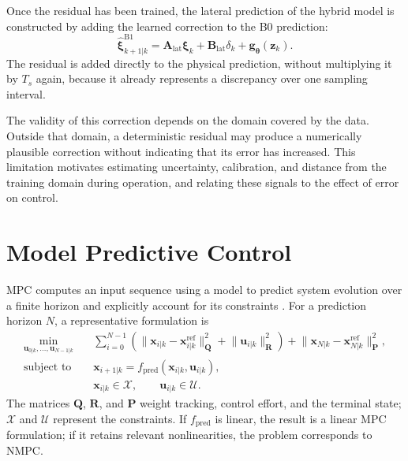 \documentclass[12pt,a4paper]{report}
\begin{document}
Once the residual has been trained, the lateral prediction of the hybrid model is constructed by adding the learned correction to the B0 prediction:
%
\begin{equation}
    \boxed{
    \hat{\boldsymbol{\xi}}^{\mathrm{B1}}_{k+1|k}
    =
    \mathbf{A}_{\mathrm{lat}}\boldsymbol{\xi}_k
    +
    \mathbf{B}_{\mathrm{lat}}\delta_k
    +
    \mathbf{g}_{\boldsymbol{\theta}}(\mathbf{z}_k).
    }
    \label{eq:b1_hybrid_prediction}
\end{equation}
%
The residual is added directly to the physical prediction, without multiplying it by $T_s$ again, because it already represents a discrepancy over one sampling interval.

The validity of this correction depends on the domain covered by the data. Outside that domain, a deterministic residual may produce a numerically plausible correction without indicating that its error has increased. This limitation motivates estimating uncertainty, calibration, and distance from the training domain during operation, and relating these signals to the effect of error on control.

\section{Model Predictive Control}

MPC computes an input sequence using a model to predict system evolution over a finite horizon and explicitly account for its constraints \cite{Su2026ReinforcementLearningBased}. For a prediction horizon $N$, a representative formulation is
\begin{align}
    \min_{\mathbf{u}_{0|k},\ldots,\mathbf{u}_{N-1|k}}\quad
    & \sum_{i=0}^{N-1}
      \left(
        \lVert \mathbf{x}_{i|k}-\mathbf{x}^{\mathrm{ref}}_{i|k}\rVert_{\mathbf{Q}}^2
        +
        \lVert \mathbf{u}_{i|k}\rVert_{\mathbf{R}}^2
      \right)
      +
      \lVert \mathbf{x}_{N|k}-\mathbf{x}^{\mathrm{ref}}_{N|k}\rVert_{\mathbf{P}}^2,
    \label{eq:mpc_cost}\\
    \text{subject to}\quad
    & \mathbf{x}_{i+1|k}
      =
      f_{\mathrm{pred}}(\mathbf{x}_{i|k},\mathbf{u}_{i|k}), \nonumber\\
    & \mathbf{x}_{i|k}\in\mathcal{X},\qquad
      \mathbf{u}_{i|k}\in\mathcal{U}. \nonumber
\end{align}
The matrices $\mathbf{Q}$, $\mathbf{R}$, and $\mathbf{P}$ weight tracking, control effort, and the terminal state; $\mathcal{X}$ and $\mathcal{U}$ represent the constraints. If $f_{\mathrm{pred}}$ is linear, the result is a linear MPC formulation; if it retains relevant nonlinearities, the problem corresponds to NMPC.
\end{document}
